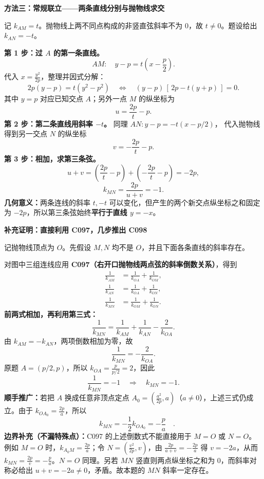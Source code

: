 \clearpage
\begin{proofbox}
\textbf{方法三：常规联立——两条直线分别与抛物线求交}
\begin{center}\end{center}


记 $k_{AM}=t$。抛物线上两不同点构成的非竖直弦斜率不为 $0$，故 $t\ne0$。题设给出 $k_{AN}=-t$。

\textbf{第 1 步：过 $A$ 的第一条直线。}
\[
 AM:\quad y-p=t\left(x-\frac p2\right).
\]
代入 $x=\frac{y^2}{2p}$，整理并因式分解：
\[
 2p(y-p)=t(y^2-p^2)
 \quad\Longleftrightarrow\quad
 (y-p)\,[\,2p-t(y+p)\,]=0.
\]
其中 $y=p$ 对应已知交点 $A$；另外一点 $M$ 的纵坐标为
\[
 \boxed{u=\frac{2p}{t}-p}.
\]
\textbf{第 2 步：第二条直线用斜率 $-t$。} 同理 $AN:y-p=-t(x-p/2)$，
代入抛物线得到另一交点 $N$ 的纵坐标
\[
 \boxed{v=-\frac{2p}{t}-p}.
\]
\textbf{第 3 步：相加，求第三条弦。}
\[
 u+v=\left(\frac{2p}{t}-p\right)
 +\left(-\frac{2p}{t}-p\right)=-2p,
\]
\[
 \boxed{k_{MN}=\frac{2p}{u+v}=-1}.
\]
\textbf{几何意义：}两条连线的斜率 $t,-t$ 可以变化，但产生的两个新交点纵坐标之和固定为 $-2p$，所以第三条弦始终\textbf{平行于直线 $y=-x$}。
\end{proofbox}


\clearpage
\begin{proofbox}
\begin{minipage}{\linewidth}
\textbf{补充证明：直接利用 C097，几步推出 C098}

记抛物线顶点为 $O$。先假设 $M,N$ 均不是 $O$，并且下面各条直线的斜率存在。
\begin{center}\end{center}
\end{minipage}

对图中三组连线应用 \textbf{C097（右开口抛物线两点弦的斜率倒数关系）}，得到
\[
\begin{aligned}
 \frac1{k_{AM}}&=\frac1{k_{OA}}+\frac1{k_{OM}},\\[3pt]
 \frac1{k_{AN}}&=\frac1{k_{OA}}+\frac1{k_{ON}},\\[3pt]
 \frac1{k_{MN}}&=\frac1{k_{OM}}+\frac1{k_{ON}}.
\end{aligned}
\]
\textbf{前两式相加，再利用第三式：}
\[
 \boxed{\frac1{k_{MN}}=\frac1{k_{AM}}+\frac1{k_{AN}}-\frac2{k_{OA}}}.
\]
由 $k_{AM}=-k_{AN}$，两项倒数相加为零，故
\[
 \frac1{k_{MN}}=-\frac2{k_{OA}}.
\]
原题 $A=(p/2,p)$，所以 $k_{OA}=\frac p{p/2}=2$，因此
\[
 \frac1{k_{MN}}=-1\quad\Longrightarrow\quad\boxed{k_{MN}=-1}.
\]
\textbf{顺手推广：}若把 $A$ 换成任意非顶点定点 $A_0=(\frac{a^2}{2p},a)$（$a\ne0$），上述三式仍成立。由于 $k_{OA_0}=\frac{2p}a$，所以
\[
 \boxed{\quad k_{MN}=-\frac12 k_{OA_0}=-\frac pa\quad}.
\]
\textbf{边界补充（不漏特殊点）：}C097 的上述倒数式不能直接用于 $M=O$ 或 $N=O$。例如 $M=O$ 时，$k_{A_0M}=\frac{2p}a$；令 $N=(\frac{v^2}{2p},v)$，由 $\frac{2p}{a+v}=-\frac{2p}a$ 得 $v=-2a$，从而 $k_{MN}=\frac{2p}{v}=-\frac pa$。$N=O$ 同理。另若 $MN$ 竖直则两点纵坐标之和为 $0$，而斜率对称必给出 $u+v=-2a\ne0$，矛盾。故本题的 $MN$ 斜率一定存在。
\end{proofbox}
